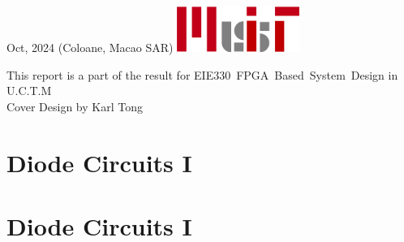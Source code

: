 \documentclass[a4paper,11pt]{article}
\begin{document}
\begin{titlepage}
    \vspace*{\fill}
		Oct, 2024\newline 
        (Coloane, Macao SAR)
        \vspace{0.7\baselineskip}\newline
        \includegraphics[width = 40mm]{../../Report_Resources/MUIT_origin.png}\par
        {\small This report is a part of the result for}
        {\small EIE330~FPGA~Based~System~Design in U.C.T.M}\\[0.25pt]
        {\small Cover Design by Karl Tong}\\[0.25pt]

\end{titlepage}
\blankpage

\tableofcontents
\newpage

\section{Diode Circuits I}
%
\lipsum[2-4]\par
\lipsum[2-4]

\section{Diode Circuits I}
\end{document}
